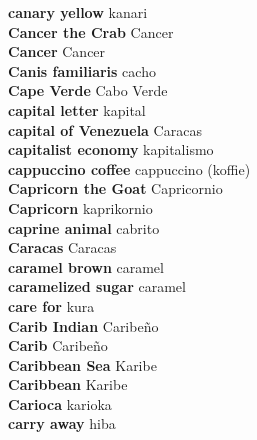 \textbf{ canary yellow  } kanari \\
\textbf{ Cancer the Crab  } Cancer \\
\textbf{ Cancer  } Cancer \\
\textbf{ Canis familiaris  } cacho \\
\textbf{ Cape Verde  } Cabo Verde \\
\textbf{ capital letter  } kapital \\
\textbf{ capital of Venezuela  } Caracas \\
\textbf{ capitalist economy  } kapitalismo \\
\textbf{ cappuccino coffee  } cappuccino (koffie) \\
\textbf{ Capricorn the Goat  } Capricornio \\
\textbf{ Capricorn  } kaprikornio \\
\textbf{ caprine animal  } cabrito \\
\textbf{ Caracas  } Caracas \\
\textbf{ caramel brown  } caramel \\
\textbf{ caramelized sugar  } caramel \\
\textbf{ care for  } kura \\
\textbf{ Carib Indian  } Caribeño \\
\textbf{ Carib  } Caribeño \\
\textbf{ Caribbean Sea  } Karibe \\
\textbf{ Caribbean  } Karibe \\
\textbf{ Carioca  } karioka \\
\textbf{ carry away  } hiba \\
